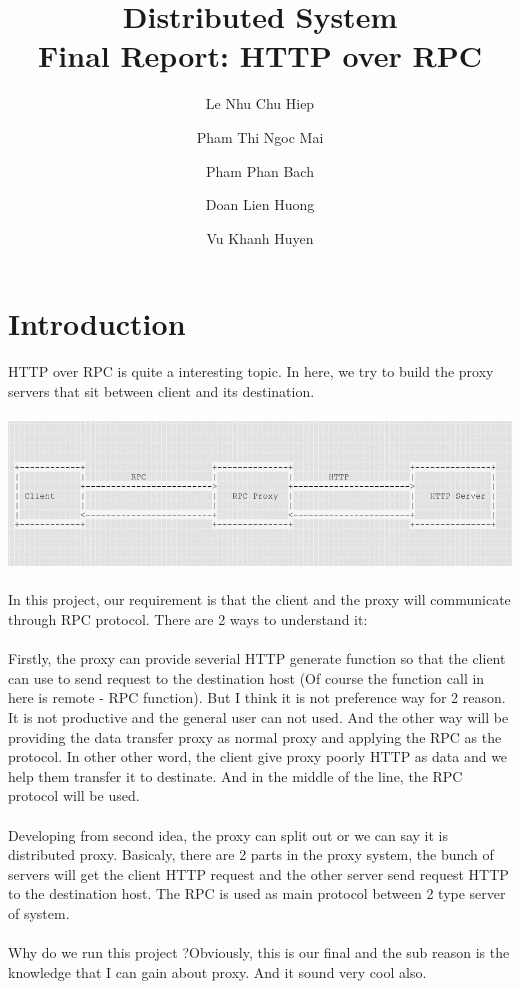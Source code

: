 \documentclass{article}
\title{Distributed System\\ Final Report: HTTP over RPC}
\author{Le Nhu Chu Hiep \and Pham Thi Ngoc Mai \and Pham Phan Bach \and Doan Lien Huong \and Vu Khanh Huyen}
\begin{document}
\maketitle
\tableofcontents
\pagebreak
\section{Introduction}
HTTP over RPC is quite a interesting topic. In here, we try
to build the proxy servers that sit between client and its
destination.
\\
\\
\includegraphics[scale=0.5]{RPC_topic}
\\
\\
In this project, our requirement is that the
client and the proxy will communicate through RPC protocol.
There are 2 ways to understand it:\\
\\
Firstly, the proxy can provide severial HTTP generate
function so that the client can use to send request to
the destination host (Of course the function call in here
is remote - RPC function).
But I think it is not preference way for 2 reason. It is
not productive and the general user can not used.
And the other way will be providing the data transfer proxy
as normal proxy and applying the RPC as the protocol. In
other other word, the client give proxy poorly HTTP as
data and we help them transfer it to destinate. And in
the middle of the line, the RPC protocol will be used.\\
\\
Developing from second idea, the proxy can split out or
we can say it is distributed proxy. Basicaly, there are
2 parts in the proxy system, the bunch of servers will
get the client HTTP request and the other server send request
HTTP to the destination host. The RPC is used as main protocol
between 2 type server of system.\\
\\
Why do we run this project ?\newline Obviously, this is our final
and the sub reason is the knowledge that I can gain about
proxy. And it sound very cool also.
\end{document}
